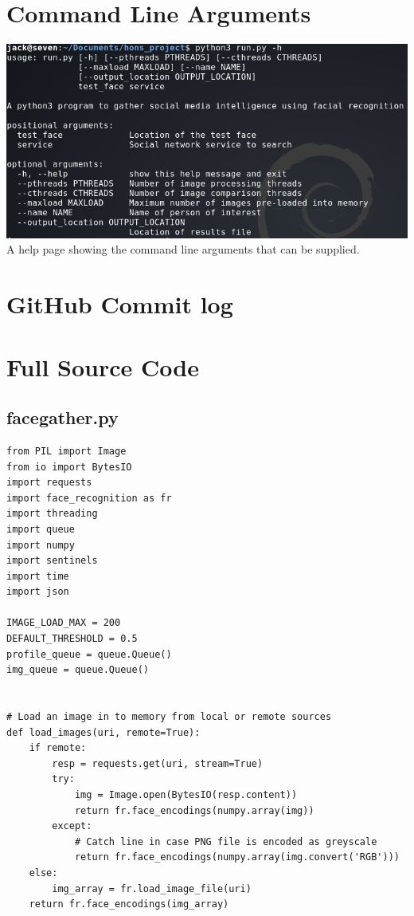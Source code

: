 \documentclass[12pt]{article}
\begin{document}
\begin{appendices}
\section{Command Line Arguments}
\label{appendix:commandlineargs}
\includegraphics[width=\linewidth]{res/facegather_cmd_line_args.png}
A help page showing the command line arguments that can be supplied.

\section{GitHub Commit log}


\section{Full Source Code}
\subsection{facegather.py}
\begin{lstlisting}
from PIL import Image
from io import BytesIO
import requests
import face_recognition as fr
import threading
import queue
import numpy
import sentinels
import time
import json

IMAGE_LOAD_MAX = 200
DEFAULT_THRESHOLD = 0.5
profile_queue = queue.Queue()
img_queue = queue.Queue()


# Load an image in to memory from local or remote sources
def load_images(uri, remote=True):
    if remote:
        resp = requests.get(uri, stream=True)
        try:
            img = Image.open(BytesIO(resp.content))
            return fr.face_encodings(numpy.array(img))
        except:
            # Catch line in case PNG file is encoded as greyscale
            return fr.face_encodings(numpy.array(img.convert('RGB')))
    else:
        img_array = fr.load_image_file(uri)
    return fr.face_encodings(img_array)



\end{lstlisting}
\end{appendices}
\end{document}
